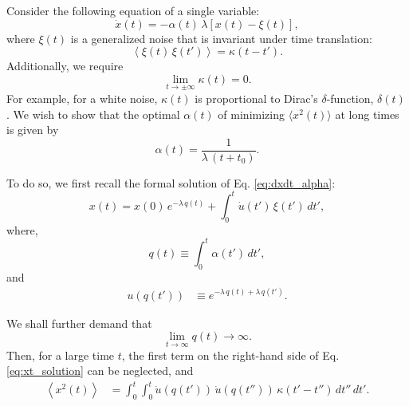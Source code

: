 \documentclass[reprint]{revtex4-1}
\begin{document}
Consider the following equation
of a single variable:
%
\begin{equation}
\dot x(t) = -\alpha(t) \, \lambda \left[ x(t) - \xi(t) \right],
\label{eq:dxdt_alpha}
\end{equation}
%
where $\xi(t)$ is a generalized noise
that is invariant under time translation:
%
\begin{equation}
\left\langle \xi(t) \, \xi(t') \right\rangle
=
\kappa(t - t').
\label{eq:noise_correlation}
\end{equation}
%
Additionally, we require
\begin{equation}
  \lim_{t \rightarrow \pm\infty} \kappa(t) = 0.
  \label{eq:kappat_limit}
\end{equation}
%
For example, for a white noise,
$\kappa(t)$ is proportional to
Dirac's $\delta$-function, $\delta(t)$.
%
We wish to show that the optimal $\alpha(t)$
of minimizing $\langle x^2(t) \rangle$ at long times
is given by
%
\begin{equation}
  \alpha(t) = \frac{1}{\lambda \, (t + t_0)}.
\label{eq:alpha_opt}
\end{equation}



To do so, we first recall
the formal solution of Eq. \eqref{eq:dxdt_alpha}:
%
\begin{equation}
x(t) = x(0) \, e^{-\lambda \, q(t)}
+ \int_0^t \dot u(t') \, \xi(t') \, dt',
\label{eq:xt_solution}
\end{equation}
%
where,
%
\begin{equation}
q(t) \equiv \int_0^t \alpha(t') \, dt',
\label{eq:qt_definition}
\end{equation}
%
and
%
\begin{align}
u(q(t'))
&\equiv
e^{-\lambda \, q(t) + \lambda \, q(t')}.
\label{eq:ut_definition}
\end{align}


We shall further demand that
%
\begin{equation}
  \lim_{t \to \infty} q(t) \to \infty.
  \label{eq:qt_limit}
\end{equation}
%
Then, for a large time $t$,
the first term on the right-hand side
of Eq. \eqref{eq:xt_solution} can be neglected, and
%
\begin{align}
\left\langle x^2(t) \right\rangle
&=
\int_0^t \int_0^t
  \dot u(q(t')) \, \dot u(q(t'')) \,
  \kappa(t' - t'') \, dt'' \, dt'.
\label{eq:x2t_average}
\end{align}
\end{document}
